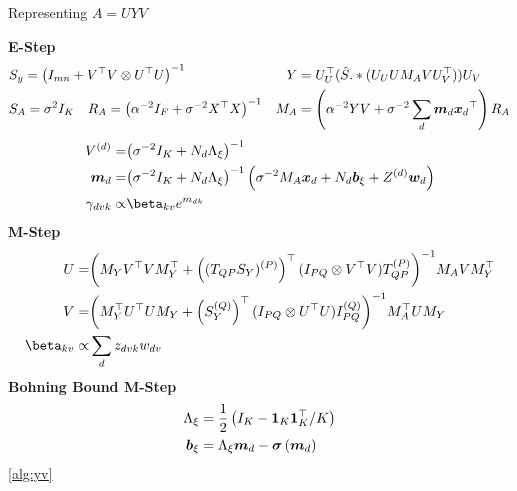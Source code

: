 %
%
%
%


\begin{algorithm}
\caption{Representing $A=UYV$}
\label{alg:uyv}
$\text{ }$\\
{\bf E-Step}
    \begin{align*}
        & S_y = {\left( I_{mn} + V^\top V \otimes U^\top U \right)}^{-1} \quad &
Y & = U_U^\top (\hat S .* (U_U U M_A V U_V^\top)) U_V \\
        & S_A = \sigma^2 I_K \quad R_A = {\left( \alpha^{-2} I_F + \sigma^{-2} X^\top X \right)}^{-1} 
        & M_A & = \left(\alpha^{-2} YV + \sigma^{-2} \sum_d \bm m_d { \bm x_d }^\top\right)R_A
    \end{align*}
    \begin{align*}
         \Vd = & \invb{\sigma^{-2}I_K + N_d \Axi}\\
         \md = & \invb{\sigma^{-2}I_K + N_d \Axi} \left(\sigma^{-2} M_A \xd  + N_d \bxi + Z^{(d)}\vv{w}_d \right )\\
        \gamma_{dvk} \propto & \beta_{kv} e^{m_{dk}} 
\end{align*}
{\bf M-Step}
\begin{align*}
    U = & \invb{\mmy V\T V \mmy\T + \left( \vt{(T_{QP} S_Y)}{P} \right)\T (I_{PQ} \otimes V\T V)\vt{T_{QP}}{P}} M_A V \mmy\T \\
    V = & \invb{\mmy\T U\T U \mmy + \left(\vt{S_Y}{Q}\right)\T (I_{PQ} \otimes U\T U) \vt{I_{PQ}}{Q} } M_A \T U \mmy \\
    \beta_{kv} \propto & \sum_d z_{dvk} w_{dv} 
\end{align*}
{\bf Bohning Bound M-Step}
    \begin{align*}
        { \Lambda_{\xi} } & = \frac{1}{2} \left(I_K - \mathbf{1}_K\mathbf{1}_K^\top / K  \right) \\
        { \bm b_{\xi} } & = { \Lambda_{\xi} } \bm m_d  - { \bm \sigma\left( \bm m_d \right) }
    \end{align*}
\ref{alg:yv}
\end{algorithm}


